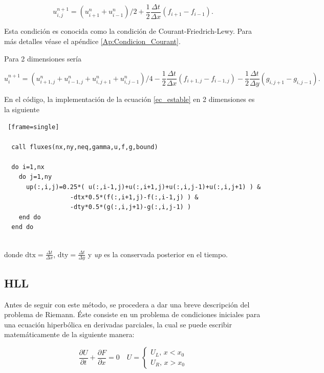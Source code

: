\documentclass[12pt,a4paper]{book}
\begin{document}
\begin{equation}\label{ec_estable}
  u_{i,j}^{n+1} =(u_{i+1}^n+u_{i-1}^n)/2 + \frac{1}{2}\frac{\Delta t}{\Delta x} \left(f_{i+1} - f_{i-1} \right).
\end{equation}

\noindent Esta condición es conocida como la condición de Courant-Friedrich-Lewy. Para más detalles véase el apéndice \ref{Ap:Condicion_Courant}.

\noindent Para 2 dimensiones sería

\begin{equation}\label{ec_estable_2D}
  u_i^{n+1} =(u_{i+1,j}^n+u_{i-1,j}^n+u_{i,j+1}^n+u_{i,j-1}^n)/4 - \frac{1}{2}\frac{\Delta t}{\Delta x} \left(f_{i+1,j} - f_{i-1,j} \right)-\frac{1}{2}\frac{\Delta t}{\Delta y} \left(g_{i,j+1} - g_{i,j-1} \right).
\end{equation}

En el código, la implementación de la ecuación \ref{ec_estable} en 2 dimensiones es la siguiente

\begin{lstlisting} [frame=single]

  call fluxes(nx,ny,neq,gamma,u,f,g,bound)

  do i=1,nx
    do j=1,ny
      up(:,i,j)=0.25*( u(:,i-1,j)+u(:,i+1,j)+u(:,i,j-1)+u(:,i,j+1) ) &
                  -dtx*0.5*(f(:,i+1,j)-f(:,i-1,j) ) &
                  -dty*0.5*(g(:,i,j+1)-g(:,i,j-1) )
    end do
  end do
  
\end{lstlisting}

\noindent donde $\text{dtx} = \frac{\Delta t}{\Delta x}$, $\text{dty} = \frac{\Delta t}{\Delta y}$ y \emph{up} es la conservada posterior en el tiempo.



\subsection{HLL} \label{secc:HLL}
Antes de seguir con este método, se procedera a dar una breve descripción del problema de Riemann. Éste consiste en un problema de condiciones iniciales para una ecuación hiperbólica en derivadas parciales, la cual
se puede escribir matemáticamente de la siguiente manera: 

\begin{equation}
  \frac{\partial U}{\partial t}+\frac{\partial F}{\partial x}=0 \quad U=\left\{\begin{array}{l}
  U_{L}, \, x<x_{0} \\
  U_{R}, \, x>x_{0} 
  \end{array}\right.
\end{equation}
\end{document}
